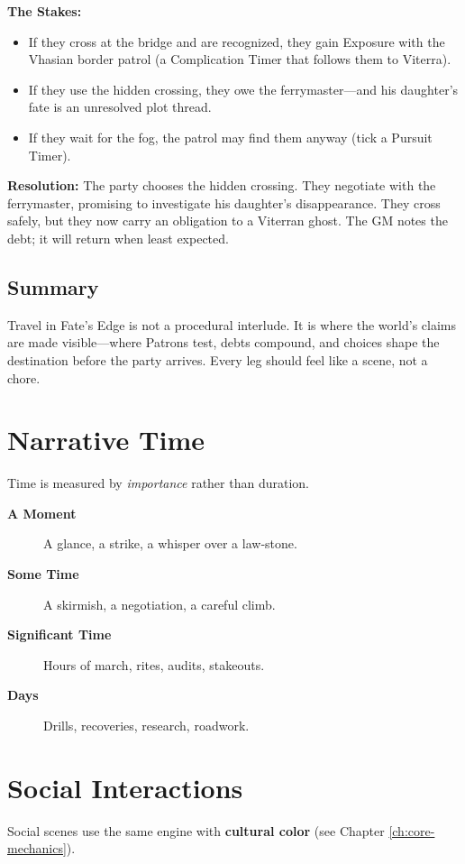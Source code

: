 \noindent \textbf{The Stakes:}
\begin{itemize}
\item If they cross at the bridge and are recognized, they gain Exposure with the Vhasian border patrol (a Complication Timer that follows them to Viterra).
\item If they use the hidden crossing, they owe the ferrymaster—and his daughter's fate is an unresolved plot thread.
\item If they wait for the fog, the patrol may find them anyway (tick a Pursuit Timer).
\end{itemize}

\noindent \textbf{Resolution:} The party chooses the hidden crossing. They negotiate with the ferrymaster, promising to investigate his daughter's disappearance. They cross safely, but they now carry an obligation to a Viterran ghost. The GM notes the debt; it will return when least expected.

\subsection*{Summary}

Travel in Fate's Edge is not a procedural interlude. It is where the world's claims are made visible—where Patrons test, debts compound, and choices shape the destination before the party arrives. Every leg should feel like a scene, not a chore.

\section{Narrative Time}
\label{sec:narrative-time}
Time is measured by \emph{importance} rather than duration.
\begin{description}
\item[\textbf{A Moment}]  A glance, a strike, a whisper over a law‑stone.
\item[\textbf{Some Time}]  A skirmish, a negotiation, a careful climb.
\item[\textbf{Significant Time}]  Hours of march, rites, audits, stakeouts.
\item[\textbf{Days}]  Drills, recoveries, research, roadwork.
\end{description}

\section{Social Interactions}
\label{sec:social-interactions}
Social scenes use the same engine with \textbf{cultural color} (see Chapter \ref{ch:core-mechanics}).

